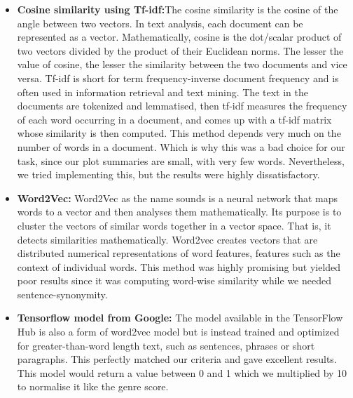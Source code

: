 \begin{itemize}
    \item \textbf{Cosine similarity using Tf-idf:}The cosine similarity is the cosine of the angle between two vectors. In text analysis, each document can be represented as a vector. Mathematically, cosine is the dot/scalar product of two vectors divided by the product of their Euclidean norms. The lesser the value of cosine, the lesser the similarity between the two documents and vice versa. Tf-idf is short for term frequency-inverse document frequency and is often used in information retrieval and text mining. The text in the documents are tokenized and lemmatised, then tf-idf measures the frequency of each word occurring in a document, and comes up with a tf-idf matrix whose similarity is then computed. This method depends very much on the number of words in a document. Which is why this was a bad choice for our task, since our plot summaries are small, with very few words. Nevertheless, we tried implementing this, but the results were highly dissatisfactory.    
    \item \textbf{Word2Vec: }Word2Vec as the name sounds is a neural network that maps words to a vector and then analyses them mathematically. Its purpose is to cluster the vectors of similar words together in a vector space. That is, it detects similarities mathematically. Word2vec creates vectors that are distributed numerical representations of word features, features such as the context of individual words. This  method  was  highly  promising  but  yielded  poor  results since it was computing word-wise similarity while we needed sentence-synonymity.
    \item \textbf{Tensorflow model from Google: }The model \cite{TFHubModel} available in the TensorFlow Hub is also a form of word2vec model but is instead trained and optimized for greater-than-word length text, such as sentences, phrases or short paragraphs. This perfectly matched our criteria and gave excellent results. This model would return a value between 0 and 1 which we multiplied by 10 to normalise it like the genre score.
\end{itemize}

